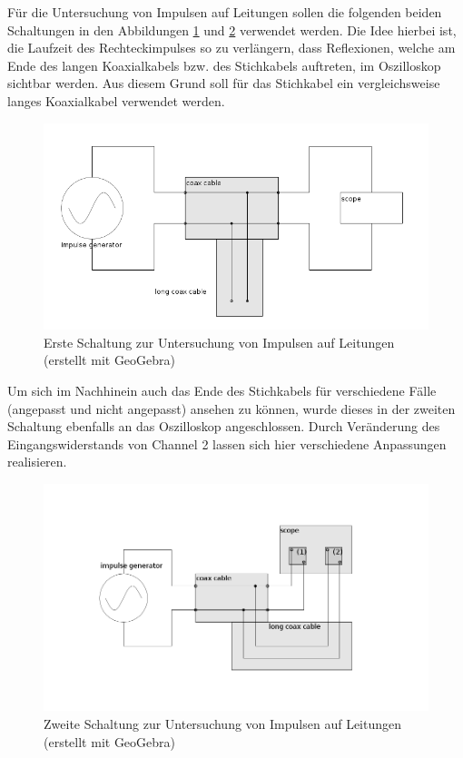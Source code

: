 	Für die Untersuchung von Impulsen auf Leitungen sollen die folgenden beiden Schaltungen in den Abbildungen \ref{schaltung_impuls_1} und \ref{schaltung_impuls_2} verwendet werden.
	Die Idee hierbei ist, die Laufzeit des Rechteckimpulses so zu verlängern, dass Reflexionen, welche am Ende des langen Koaxialkabels bzw. des Stichkabels auftreten, im Oszilloskop sichtbar werden.
	Aus diesem Grund soll für das Stichkabel ein vergleichsweise langes Koaxialkabel verwendet werden.

	\begin{figure}[H]
		\center
		\includegraphics[scale = 0.8]{schaltung-impuls-01.png}
		\caption{\centering Erste Schaltung zur Untersuchung von Impulsen auf Leitungen (erstellt mit GeoGebra)}
		\label{schaltung_impuls_1}
	\end{figure}

	Um sich im Nachhinein auch das Ende des Stichkabels für verschiedene Fälle (angepasst und nicht angepasst) ansehen zu können, wurde dieses in der zweiten Schaltung ebenfalls an das Oszilloskop angeschlossen.
	Durch Veränderung des Eingangswiderstands von Channel 2 lassen sich hier verschiedene Anpassungen realisieren.

	\begin{figure}[H]
		\center
		\includegraphics[scale = 0.8]{schaltung-impuls-02.png}
		\caption{\centering Zweite Schaltung zur Untersuchung von Impulsen auf Leitungen (erstellt mit GeoGebra)}
		\label{schaltung_impuls_2}
	\end{figure}


